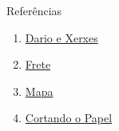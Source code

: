 \begin{frame}[fragile]{Referências}

    \begin{enumerate}
        \item \href{https://olimpiada.ic.unicamp.br/pratique/pu/2017/f2/xerxes/}{Dario e Xerxes} 
 
        \item \href{https://olimpiada.ic.unicamp.br/pratique/pu/2017/f2/frete/}{Frete}
 
        \item \href{https://olimpiada.ic.unicamp.br/pratique/pu/2017/f2/mapa/}{Mapa}

        \item \href{https://olimpiada.ic.unicamp.br/pratique/pu/2017/f2/papel/}{Cortando o Papel}

    \end{enumerate}

\end{frame}
